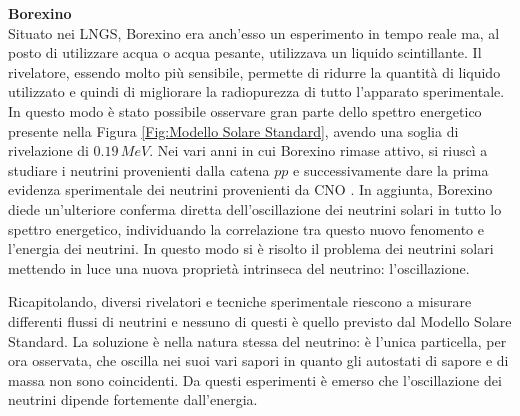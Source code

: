 \textbf{Borexino}\\
Situato nei LNGS, Borexino era anch'esso un esperimento in tempo reale ma, al posto di utilizzare acqua o acqua pesante, utilizzava un liquido scintillante. Il rivelatore, essendo molto più sensibile, permette di ridurre la quantità di liquido utilizzato e quindi di migliorare la radiopurezza di tutto l'apparato sperimentale. In questo modo è stato possibile osservare gran parte dello spettro energetico presente nella Figura \ref{Fig:Modello Solare Standard}, avendo una soglia di rivelazione di $0.19\,\unit{MeV}$. Nei vari anni in cui Borexino rimase attivo, si riuscì a studiare i neutrini provenienti dalla catena $pp$ \cite{BOREXINO:2014pcl} e successivamente dare la prima evidenza sperimentale dei neutrini provenienti da CNO \cite{BOREXINO:2020aww}. In aggiunta, Borexino diede un'ulteriore conferma diretta dell'oscillazione dei neutrini solari in tutto lo spettro energetico, individuando la correlazione tra questo nuovo fenomento e l'energia dei neutrini.
In questo modo si è risolto il problema dei neutrini solari mettendo in luce una nuova proprietà intrinseca del neutrino: l'oscillazione. 


Ricapitolando, diversi rivelatori e tecniche sperimentale riescono a misurare differenti flussi di neutrini e nessuno di questi è quello previsto dal Modello Solare Standard. La soluzione è nella natura stessa del neutrino: è l'unica particella, per ora osservata, che oscilla nei suoi vari sapori in quanto gli autostati di sapore e di massa non sono coincidenti. Da questi esperimenti è emerso che l'oscillazione dei neutrini dipende fortemente dall'energia.
